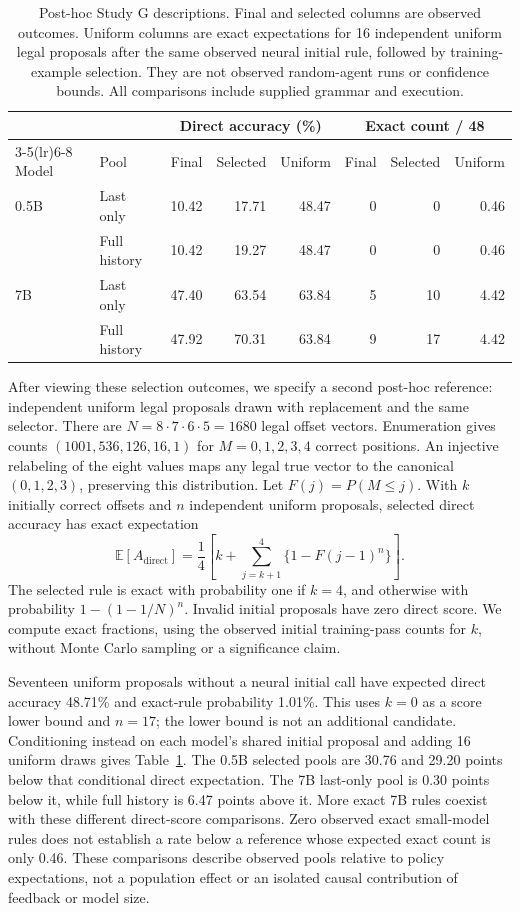 \documentclass[11pt]{article}
\begin{document}
\begin{table}[htbp]
\centering\small
\begin{tabular}{llrrrrrr}
\toprule
& & \multicolumn{3}{c}{Direct accuracy (\%)} & \multicolumn{3}{c}{Exact count / 48} \\
\cmidrule(lr){3-5}\cmidrule(lr){6-8}
Model & Pool & Final & Selected & Uniform & Final & Selected & Uniform \\
\midrule
0.5B & Last only & 10.42 & 17.71 & 48.47 & 0 & 0 & 0.46 \\
& Full history & 10.42 & 19.27 & 48.47 & 0 & 0 & 0.46 \\
7B & Last only & 47.40 & 63.54 & 63.84 & 5 & 10 & 4.42 \\
& Full history & 47.92 & 70.31 & 63.84 & 9 & 17 & 4.42 \\
\bottomrule
\end{tabular}
\caption{Post-hoc Study G descriptions. Final and selected columns are
observed outcomes. Uniform columns are exact expectations for 16 independent
uniform legal proposals after the same observed neural initial rule, followed
by training-example selection. They are not observed random-agent runs or
confidence bounds. All comparisons include supplied grammar and execution.}
\label{tab:selection}
\end{table}

After viewing these selection outcomes, we specify a second post-hoc
reference: independent uniform legal proposals drawn with replacement and
the same selector. There are $N=8\cdot7\cdot6\cdot5=1680$ legal offset vectors.
Enumeration gives counts $(1001,536,126,16,1)$ for $M=0,1,2,3,4$ correct
positions. An injective relabeling of the eight values maps any legal true
vector to the canonical $(0,1,2,3)$, preserving this distribution. Let
$F(j)=P(M\leq j)$. With $k$ initially correct offsets and $n$ independent
uniform proposals, selected direct accuracy has exact expectation
\[
 \mathbb{E}[A_{\mathrm{direct}}]
 =\frac{1}{4}\left[k+\sum_{j=k+1}^{4}\{1-F(j-1)^n\}\right].
\]
The selected rule is exact with probability one if $k=4$, and otherwise with
probability $1-(1-1/N)^n$. Invalid initial proposals have zero direct score.
We compute exact fractions, using the observed initial training-pass counts
for $k$, without Monte Carlo sampling or a significance claim.

Seventeen uniform proposals without a neural initial call have expected
direct accuracy 48.71\% and exact-rule probability 1.01\%. This uses $k=0$
as a score lower bound and $n=17$; the lower bound is not an additional
candidate. Conditioning instead on each model's shared initial proposal and
adding 16 uniform draws gives Table~\ref{tab:selection}. The 0.5B selected
pools are 30.76 and 29.20 points below that conditional direct expectation.
The 7B last-only pool is 0.30 points below it, while full history is 6.47
points above it. More exact 7B rules coexist with these different direct-score
comparisons. Zero observed exact small-model rules does not establish a rate
below a reference whose expected exact count is only 0.46. These comparisons
describe observed pools relative to policy expectations, not a population
effect or an isolated causal contribution of feedback or model size.
\end{document}
